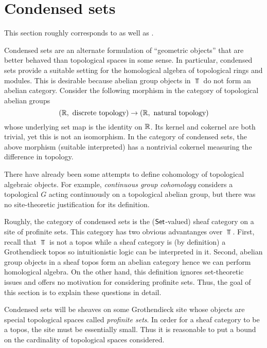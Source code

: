 \documentclass[./main.tex]{subfiles}
\begin{document}
\section{Condensed sets}

\begin{remark}
This section roughly corresponds to \cite[Lecture 1]{scholze1} as well as \cite[Lectures 1-3]{masterclass}. 
\end{remark}

Condensed sets are an alternate formulation of ``geometric objects'' that are better behaved than topological spaces in some sense. In particular, condensed sets provide a suitable setting for the homological algebra of topological rings and modules. This is desirable because abelian group objects in $\Top$ do not form an abelian category. Consider the following morphism in the category of topological abelian groups
$$(\mathbb{R}, \text{ discrete topology}) \rightarrow (\mathbb{R}, \text{ natural topology})$$
whose underlying set map is the identity on $\mathbb{R}$. Its kernel and cokernel are both trivial, yet this is not an isomorphism. In the category of condensed sets, the above morphism (suitable interpreted) has a nontrivial cokernel measuring the difference in topology.

There have already been some attempts to define cohomology of topological algebraic objects. For example, \textit{continuous group cohomology} considers a topological $G$ acting continuously on a topological abelian group, but there was no site-theoretic justification for its definition. 

Roughly, the category of condensed sets is the ($\mathsf{Set}$-valued) sheaf category on a site of profinite sets. This category has two obvious advantanges over $\Top$. First, recall that $\Top$ is not a topos while a sheaf category is (by definition) a Grothendieck topos so intuitionistic logic can be interpreted in it. Second, abelian group objects in a sheaf topos form an abelian category hence we can perform homological algebra. On the other hand, this definition ignores set-theoretic issues and offers no motivation for considering profinite sets. Thus, the goal of this section is to explain these questions in detail. 

Condensed sets will be sheaves on some Grothendieck site whose objects are special topological spaces called \textit{profinite sets}. In order for a sheaf category to be a topos, the site must be essentially small. Thus it is reasonable to put a bound on the cardinality of topological spaces considered. 
\end{document}
